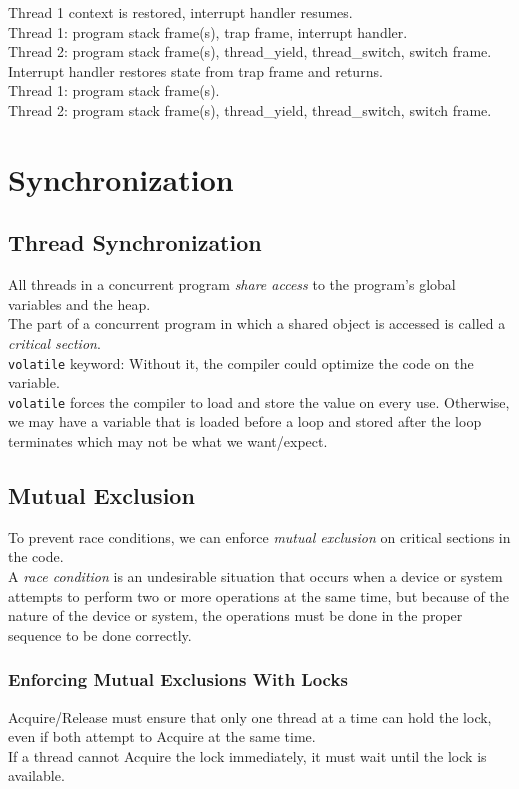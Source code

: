 \documentclass[12pt]{article}
\theoremstyle{plain}
\theoremstyle{definition}
\begin{document}
Thread 1 context is restored, interrupt handler resumes. \\
Thread 1: program stack frame(s), trap frame, interrupt handler. \\
Thread 2: program stack frame(s), thread\_yield, thread\_switch, switch frame. \\

Interrupt handler restores state from trap frame and returns. \\
Thread 1: program stack frame(s). \\
Thread 2: program stack frame(s), thread\_yield, thread\_switch, switch frame.


\newpage
\section{Synchronization}
\subsection{Thread Synchronization}
All threads in a concurrent program \emph{share access} to the program's global variables and the heap. \\
The part of a concurrent program in which a shared object is accessed is called a \emph{critical section}. \\

\texttt{volatile} keyword:
Without it, the compiler could optimize the code on the variable. \\
\texttt{volatile} forces the compiler to load and store the value on every use.
Otherwise, we may have a variable that is loaded before a loop and stored after the loop terminates which may not be what we want/expect.

\subsection{Mutual Exclusion}
To prevent race conditions, we can enforce \emph{mutual exclusion} on critical sections in the code. \\

A \emph{race condition} is an undesirable situation that occurs when a device or system attempts to perform two or more operations at the same time, but because of the nature of the device or system, the operations must be done in the proper sequence to be done correctly.

\subsubsection{Enforcing Mutual Exclusions With Locks}
Acquire/Release must ensure that only one thread at a time can hold the lock, even if both attempt to Acquire at the same time. \\
If a thread cannot Acquire the lock immediately, it must wait until the lock is available.
\end{document}
